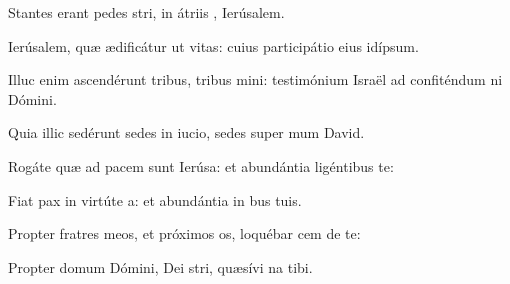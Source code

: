 \item {}

\item Stantes erant pedes stri,\psstar{} in átriis , Ierúsalem.

\item Ierúsalem, quæ ædificátur ut vitas:\psstar{} cuius participátio eius  idípsum.

\item Illuc enim ascendérunt tribus, tribus mini:\psstar{} testimónium Israël ad confiténdum ni Dómini.

\item Quia illic sedérunt sedes in iucio,\psstar{} sedes super mum David.

\item Rogáte quæ ad pacem sunt Ierúsa:\psstar{} et abundántia ligéntibus te:

\item Fiat pax in virtúte a:\psstar{} et abundántia in bus tuis.

\item Propter fratres meos, et próximos os,\psstar{} loquébar cem de te:

\item Propter domum Dómini, Dei stri,\psstar{} quæsívi na tibi.